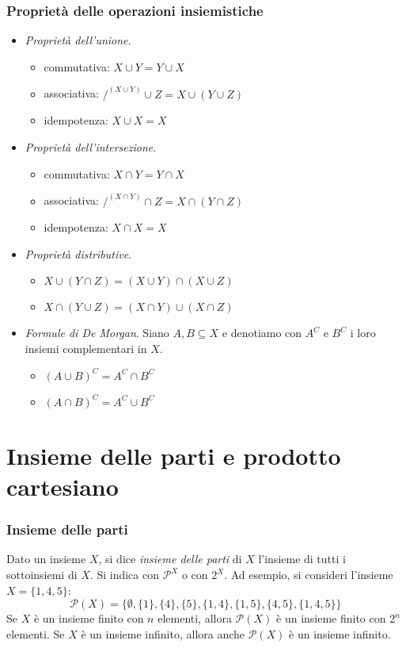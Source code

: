 \documentclass[11pt]{book}
\begin{document}
\subsubsection*{Proprietà delle operazioni insiemistiche}
\begin{itemize}
    \item \textit{Proprietà dell'unione}.
        \begin{itemize}
            \item [] commutativa: $X\cup Y=Y\cup X$
            \item [] associativa: $/^(X\cup Y)\cup Z = X\cup (Y\cup Z)$
            \item [] idempotenza: $X\cup X=X$
        \end{itemize}
    \item \textit{Proprietà dell'intersezione}.
    \begin{itemize}
        \item [] commutativa: $X\cap Y=Y\cap X$
        \item [] associativa: $/^(X\cap Y)\cap Z = X\cap (Y\cap Z)$
        \item [] idempotenza: $X\cap X=X$
    \end{itemize}
    \item \textit{Proprietà distributive}.
    \begin{itemize}
        \item [] $X\cup (Y\cap Z)=(X\cup Y)\cap(X\cup Z)$
        \item [] $X\cap (Y\cup Z)=(X\cap Y)\cup(X\cap Z)$
    \end{itemize}
    \item \textit{Formule di De Morgan}.
    Siano $A,B\subseteq X$ e denotiamo con $A^C$ e $B^C$ i loro insiemi complementari in $X$.
    \begin{itemize}
        \item [] $(A\cup B)^C =A^C \cap B^C$
        \item [] $(A\cap B)^C =A^C \cup B^C$
    \end{itemize}
\end{itemize}
\section{Insieme delle parti e prodotto cartesiano}
\subsubsection*{Insieme delle parti}
Dato un insieme $X$, si dice \textit{insieme delle parti} di $X$ l'insieme di tutti i sottoinsiemi di $X$. Si indica con 
$\mathcal{P}^X$ o con $2^X$. Ad esempio, si consideri l'insieme $X=\{1,4,5\}$:
\begin{equation*}
    \mathcal{P}(X)=\{\emptyset,\{1\},\{4\},\{5\},\{1,4\},\{1,5\},\{4,5\},\{1,4,5\}\}
\end{equation*}
Se $X$ è un insieme finito con $n$ elementi, allora $\mathcal{P}(X)$ è un insieme finito con $2^n$ elementi. Se $X$ è un 
insieme infinito, allora anche $\mathcal{P}(X)$ è un insieme infinito.
\end{document}
